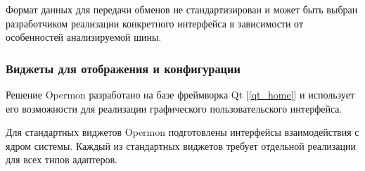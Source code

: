 Формат данных для передачи обменов не стандартизирован и может быть выбран разработчиком реализации конкретного интерфейса в зависимости от особенностей анализируемой шины.

\subsubsection{Виджеты для отображения и конфигурации}

Решение Opermon разработано на базе фреймворка Qt [\ref{qt_home}] и использует его возможности для реализации графического пользовательского интерфейса.

Для стандартных виджетов Opermon подготовлены интерфейсы взаимодействия с ядром системы. Каждый из стандартных виджетов требует отдельной реализации для всех типов адаптеров.
